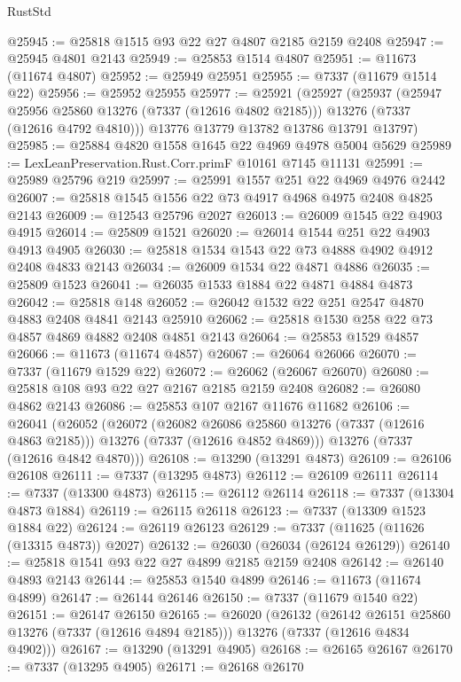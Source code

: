 \begin{lexlean}{RustStd}
\begin{coremodule}
@25945 := @25818 @1515 @93 @22 @27 @4807 @2185 @2159 @2408
@25947 := @25945 @4801 @2143
@25949 := @25853 @1514 @4807
@25951 := @11673 (@11674 @4807)
@25952 := @25949 @25951
@25955 := @7337 (@11679 @1514 @22)
@25956 := @25952 @25955
@25977 := @25921
    (@25927
      (@25937
        (@25947 @25956 @25860 @13276 (@7337 (@12616 @4802 @2185)))
        @13276
        (@7337 (@12616 @4792 @4810)))
      @13776
      @13779
      @13782
      @13786
      @13791
      @13797)
@25985 := @25884 @4820 @1558 @1645 @22 @4969 @4978 @5004 @5629
@25989 := LexLeanPreservation.Rust.Corr.primF @10161 @7145 @11131
@25991 := @25989 @25796 @219
@25997 := @25991 @1557 @251 @22 @4969 @4976 @2442
@26007 := @25818 @1545 @1556 @22 @73 @4917 @4968 @4975 @2408 @4825 @2143
@26009 := @12543 @25796 @2027
@26013 := @26009 @1545 @22 @4903 @4915
@26014 := @25809 @1521
@26020 := @26014 @1544 @251 @22 @4903 @4913 @4905
@26030 := @25818 @1534 @1543 @22 @73 @4888 @4902 @4912 @2408 @4833 @2143
@26034 := @26009 @1534 @22 @4871 @4886
@26035 := @25809 @1523
@26041 := @26035 @1533 @1884 @22 @4871 @4884 @4873
@26042 := @25818 @148
@26052 := @26042 @1532 @22 @251 @2547 @4870 @4883 @2408 @4841 @2143 @25910
@26062 := @25818 @1530 @258 @22 @73 @4857 @4869 @4882 @2408 @4851 @2143
@26064 := @25853 @1529 @4857
@26066 := @11673 (@11674 @4857)
@26067 := @26064 @26066
@26070 := @7337 (@11679 @1529 @22)
@26072 := @26062 (@26067 @26070)
@26080 := @25818 @108 @93 @22 @27 @2167 @2185 @2159 @2408
@26082 := @26080 @4862 @2143
@26086 := @25853 @107 @2167 @11676 @11682
@26106 := @26041
    (@26052
      (@26072
        (@26082 @26086 @25860 @13276 (@7337 (@12616 @4863 @2185)))
        @13276
        (@7337 (@12616 @4852 @4869)))
      @13276
      (@7337 (@12616 @4842 @4870)))
@26108 := @13290 (@13291 @4873)
@26109 := @26106 @26108
@26111 := @7337 (@13295 @4873)
@26112 := @26109 @26111
@26114 := @7337 (@13300 @4873)
@26115 := @26112 @26114
@26118 := @7337 (@13304 @4873 @1884)
@26119 := @26115 @26118
@26123 := @7337 (@13309 @1523 @1884 @22)
@26124 := @26119 @26123
@26129 := @7337 (@11625 (@11626 (@13315 @4873)) @2027)
@26132 := @26030 (@26034 (@26124 @26129))
@26140 := @25818 @1541 @93 @22 @27 @4899 @2185 @2159 @2408
@26142 := @26140 @4893 @2143
@26144 := @25853 @1540 @4899
@26146 := @11673 (@11674 @4899)
@26147 := @26144 @26146
@26150 := @7337 (@11679 @1540 @22)
@26151 := @26147 @26150
@26165 := @26020
    (@26132
      (@26142 @26151 @25860 @13276 (@7337 (@12616 @4894 @2185)))
      @13276
      (@7337 (@12616 @4834 @4902)))
@26167 := @13290 (@13291 @4905)
@26168 := @26165 @26167
@26170 := @7337 (@13295 @4905)
@26171 := @26168 @26170

\end{coremodule}
\end{lexlean}
